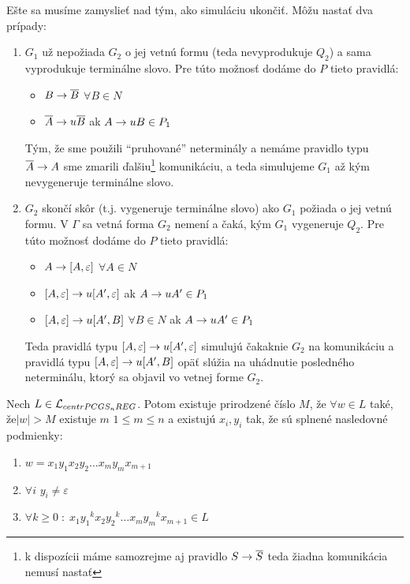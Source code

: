 \begin{dokaz}
  \smallskip

  Ešte sa musíme zamyslieť nad tým, ako simuláciu ukončiť. Môžu
  nastať dva prípady:
  \begin{enumerate}
    \item $G_1$ už nepožiada $G_2$ o jej vetnú formu (teda nevyprodukuje $Q_2$)
    a sama vyprodukuje terminálne slovo. Pre túto možnosť dodáme do
    $P$ tieto pravidlá:
    \begin{itemize}
      \item $B\rightarrow \overline{B}$  $\forall B\in N$
      \item $\overline{A}\rightarrow u\overline{B}$ ak $A\rightarrow uB\in P_1$
    \end{itemize}
    Tým, že sme použili ``pruhované'' neterminály a nemáme pravidlo
    typu $\overline{A}\rightarrow A$ sme zmarili ďalšiu\footnote{k dispozícii
    máme samozrejme aj pravidlo $S\rightarrow\overline{S}$ teda
    žiadna komunikácia nemusí nastať} komunikáciu, a teda simulujeme
    $G_1$ až kým nevygeneruje terminálne slovo.
    \item $G_2$ skončí skôr (t.j. vygeneruje terminálne slovo) ako
    $G_1$ požiada o jej vetnú formu. V $\Gamma$ sa vetná forma $G_2$
    nemení a čaká, kým $G_1$ vygeneruje $Q_2$. Pre túto možnosť dodáme
    do $P$ tieto pravidlá:
    \begin{itemize}
      \item $A\rightarrow [A,\varepsilon]$  $\forall A\in N$
      \item $[A,\varepsilon]\rightarrow u[A',\varepsilon]$ ak $A\rightarrow uA'\in P_1$
      \item $[A,\varepsilon]\rightarrow u[A',B]$  $\forall B\in N$ ak $A\rightarrow uA'\in P_1$
    \end{itemize}
  Teda pravidlá typu $[A,\varepsilon]\rightarrow u[A',\varepsilon]$ simulujú
  čakaknie $G_2$ na komunikáciu a pravidlá typu $[A,\varepsilon]\rightarrow
  u[A',B]$ opäť slúžia na uhádnutie posledného neterminálu, ktorý sa
  objavil vo vetnej forme $G_2$.
  \end{enumerate}
\end{dokaz}

\begin{lema}
  \label{pcgs_lema_pumplemacentrPCGSnREG}

  Nech $L \in \mathcal{L}_{centrPCGS_n REG}$.
  Potom existuje prirodzené číslo $M$, že
  $\forall w\in L$ také, že\linebreak $|w|>M$ existuje $m$ $1\leq
  m\leq n$ a existujú $x_i,y_i$ tak, že sú splnené nasledovné
  podmienky:
  \begin{enumerate}
    \item $w=x_1y_1x_2y_2\dots x_my_mx_{m+1}$
    \item $\forall i$ $y_i\neq\varepsilon$
    \item $\forall k\geq 0\; :\; x_1{y_1}^kx_2{y_2}^k\dots x_m{y_m}^kx_{m+1}\in L$
  \end{enumerate}
\end{lema}

